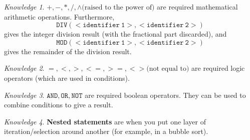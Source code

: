 \documentclass[8pt]{article}
\theoremstyle{remark}
\newtheorem{knowledge}{Knowledge}[subsection]
\begin{document}
            \begin{knowledge}
                \(\mathtt{+}, \mathtt{-}, \mathtt{*}, \mathtt{/}, \mathtt{\wedge} \text{(raised to the power of)}\) are required mathematical arithmetic operations. Furthermore,
                \[
                    \mathtt{DIV(<identifier\ 1>, <identifier\ 2>)}
                \]
                gives the integer division result (with the fractional part discarded), and
                \[
                    \mathtt{MOD(<identifier\ 1>, <identifier\ 2>)}
                \]
                gives the remainder of the division result.
            \end{knowledge}

            \begin{knowledge}
                \(\mathtt{=}, \mathtt{<}, \mathtt{>}, \mathtt{<=}, \mathtt{>=}, \mathtt{<>} \text{(not equal to)}\) are required logic operators (which are used in conditions).
            \end{knowledge}

            \begin{knowledge}
                \(\mathtt{AND}, \mathtt{OR}, \mathtt{NOT}\) are required boolean operators. They can be used to combine conditions to give a result.
            \end{knowledge}

            \begin{knowledge}
                \textbf{Nested statements} are when you put one layer of iteration/selection around another (for example, in a bubble sort).
            \end{knowledge}
\end{document}

